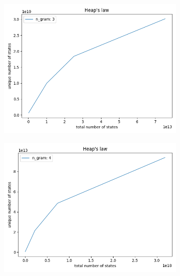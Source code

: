 \documentclass{article}
\begin{document}
\begin{figure}
\begin{subfigure}[b]{0.49\textwidth}
         \label{fig:mesh1}
     \end{subfigure}
     \hfill
     \begin{subfigure}[b]{0.49\textwidth}
         \centering
         \includegraphics[width=\textwidth]{heaps3}
         \label{fig:mesh1}
     \end{subfigure}
     \hfill
     \begin{subfigure}[b]{0.49\textwidth}
         \centering
         \includegraphics[width=\textwidth]{heaps4}
         \label{fig:mesh1}
     \end{subfigure}
     \hfill
     \begin{subfigure}[b]{0.49\textwidth}
         \centering

\end{subfigure}
\end{figure}
\end{document}
